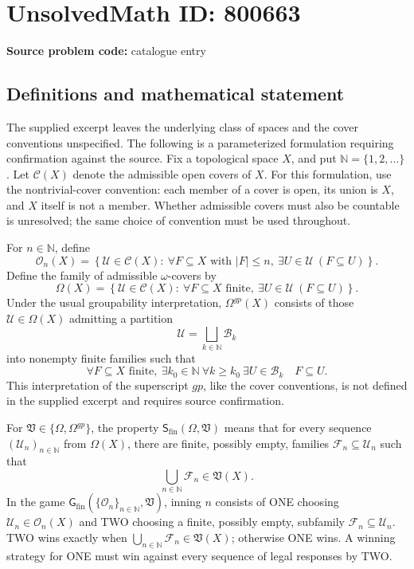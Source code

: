 \documentclass[11pt]{article}
\newcommand{\N}{\mathbb{N}}
\begin{document}
\section*{UnsolvedMath ID: 800663}
\textbf{Source problem code:} catalogue entry
\subsection{Definitions and mathematical statement}
The supplied excerpt leaves the underlying class of spaces and the cover conventions unspecified. The following is a parameterized formulation requiring confirmation against the source. Fix a topological space \(X\), and put \(\N=\{1,2,\ldots\}\). Let \(\mathscr C(X)\) denote the admissible open covers of \(X\). For this formulation, use the nontrivial-cover convention: each member of a cover is open, its union is \(X\), and \(X\) itself is not a member. Whether admissible covers must also be countable is unresolved; the same choice of convention must be used throughout.

For \(n\in\N\), define
\[
\mathcal O_n(X)=\left\{\mathcal U\in\mathscr C(X):\ \forall F\subseteq X\text{ with }|F|\le n,\ \exists U\in\mathcal U\ (F\subseteq U)\right\}.
\]
Define the family of admissible \(\omega\)-covers by
\[
\Omega(X)=\left\{\mathcal U\in\mathscr C(X):\ \forall F\subseteq X\text{ finite},\ \exists U\in\mathcal U\ (F\subseteq U)\right\}.
\]
Under the usual groupability interpretation, \(\Omega^{gp}(X)\) consists of those \(\mathcal U\in\Omega(X)\) admitting a partition
\[
\mathcal U=\bigsqcup_{k\in\N}\mathcal B_k
\]
into nonempty finite families such that
\[
\forall F\subseteq X\text{ finite},\ \exists k_0\in\N\ \forall k\ge k_0\ \exists U\in\mathcal B_k\quad F\subseteq U.
\]
This interpretation of the superscript \(gp\), like the cover conventions, is not defined in the supplied excerpt and requires source confirmation.

For \(\mathfrak V\in\{\Omega,\Omega^{gp}\}\), the property \(\mathsf S_{\mathrm{fin}}(\Omega,\mathfrak V)\) means that for every sequence \((\mathcal U_n)_{n\in\N}\) from \(\Omega(X)\), there are finite, possibly empty, families \(\mathcal F_n\subseteq\mathcal U_n\) such that
\[
\bigcup_{n\in\N}\mathcal F_n\in\mathfrak V(X).
\]
In the game \(\mathsf G_{\mathrm{fin}}(\{\mathcal O_n\}_{n\in\N},\mathfrak V)\), inning \(n\) consists of ONE choosing \(\mathcal U_n\in\mathcal O_n(X)\) and TWO choosing a finite, possibly empty, subfamily \(\mathcal F_n\subseteq\mathcal U_n\). TWO wins exactly when \(\bigcup_{n\in\N}\mathcal F_n\in\mathfrak V(X)\); otherwise ONE wins. A winning strategy for ONE must win against every sequence of legal responses by TWO.
\end{document}
